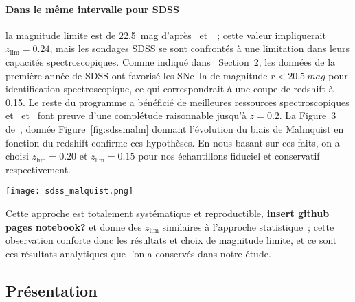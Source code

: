 \documentclass[../main/main.tex]{subfiles}
\begin{document}
\paragraph*{Dans le même intervalle pour SDSS} la magnitude limite est de
\SI{22.5}{mag} d'après~\cite{dilday2008} et~\cite{sako2008}~; cette valeur 
impliquerait $z_{\lim}=0.24$, mais les sondages SDSS se sont confrontés à une
limitation dans leurs capacités spectroscopiques. Comme indiqué
dans~\cite{kessler2009a} Section~2, les données de la première année de SDSS ont
favorisé les SNe~Ia de magnitude $r < \SI{20.5}{mag}$ pour identification
spectroscopique, ce qui correspondrait à une coupe de redshift à 0.15. Le reste
du programme a bénéficié de meilleures ressources spectroscopiques
et~\cite{kessler2009a} et~\cite{dilday2008} font preuve d'une complétude
raisonnable jusqu'à $z=0.2$. La Figure~3 de~\cite{conley2011}, donnée
Figure~\ref{fig:sdssmalm} donnant l'évolution du biais de Malmquist en fonction
du redshift confirme ces hypothèses. En nous basant sur ces faits, on a choisi
$z_{\lim}=0.20$ et $z_{\lim}=0.15$ pour nos échantillons fiduciel et conservatif
respectivement.

\begin{SCfigure}[0.7]
    \centering
    \texttt{[image: sdss\_malquist.png]}
    \caption[Biais de Malmquist moyen en fonction du redshift pour le sondage
    SDSS.]{Biais de Malmquist moyen en fonction du redshift pour le sondage
        SDSS. La forte baisse à $z=0.15$ est un artéfact dû à la discontinuité
        du modèle d'efficacité spectroscopique et n'a que peu d'effet sur les
    contraintes cosmologiques. Figure tirée de~\cite{conley2011}.}
    \label{fig:sdssmalm}
\end{SCfigure}

Cette approche est totalement systématique et reproductible, \textbf{insert
github pages notebook?} et donne des $z_{\lim}$ similaires à l'approche
statistique~; cette observation conforte donc les résultats et choix de
magnitude limite, et ce sont ces résultats analytiques que l'on a conservés dans
notre étude.

\subsection{Présentation}\label{ssec:dataset}
\end{document}
